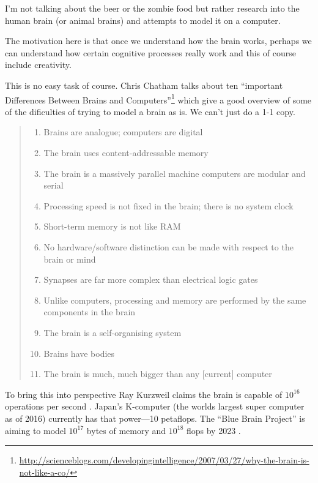 \documentclass[11pt]{thesis} %
\begin{document}
I'm not talking about the beer or the zombie food but rather research into the human brain (or animal brains) and attempts to model it on a computer. 

The motivation here is that once we understand how the brain works, perhaps we can understand how certain cognitive processes really work and this of course include creativity.

This is no easy task of course. Chris Chatham talks about ten ``important Differences Between Brains and Computers''\footnote{\url{http://scienceblogs.com/developingintelligence/2007/03/27/why-the-brain-is-not-like-a-co/}} which give a good overview of some of the dificulties of trying to model a brain as is. We can't just do a 1-1 copy.

\begin{quotation}
  \begin{enumerate}
    \item Brains are analogue; computers are digital
    \item The brain uses content-addressable memory
    \item The brain is a massively parallel machine computers are modular and serial
    \item Processing speed is not fixed in the brain; there is no system clock
    \item Short-term memory is not like RAM
    \item No hardware/software distinction can be made with respect to the brain or mind
    \item Synapses are far more complex than electrical logic gates
    \item Unlike computers, processing and memory are performed by the same components in the brain
    \item The brain is a self-organising system
    \item Brains have bodies
    \item	The brain is much, much bigger than any [current] computer
  \end{enumerate}
\end{quotation}

To bring this into perspective Ray Kurzweil claims the brain is capable of $10^{16}$ operations per second \citeyear[p.194]{Kurzweil2013}. Japan's K-computer (the worlds largest super computer as of 2016) currently has that power---10 petaflops. The ``Blue Brain Project'' is aiming to model $10^17$ bytes of memory and $10^{18}$ flops by 2023 \autocite[p.125]{Kurzweil2013}.
\end{document}
